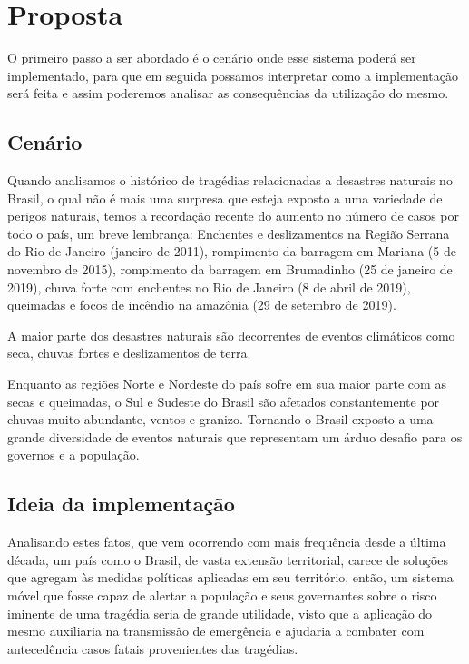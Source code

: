 \documentclass[conference]{IEEEtran}
\begin{document}
\section{Proposta}

O primeiro passo a ser abordado é o cenário onde esse sistema poderá ser implementado, para que em seguida possamos interpretar como a implementação será feita e  assim poderemos analisar as consequências da utilização do mesmo.

\subsection{Cenário}\label{AA}
Quando analisamos o histórico de tragédias relacionadas a desastres naturais no Brasil, o qual não é mais uma surpresa que esteja exposto a uma variedade de perigos naturais, temos a recordação recente do aumento no número de casos por todo o país, um breve lembrança: Enchentes e deslizamentos na Região Serrana do Rio de Janeiro (janeiro de 2011), rompimento da barragem em Mariana (5 de novembro de 2015), rompimento da barragem em Brumadinho (25 de janeiro de 2019), chuva forte com enchentes no Rio de Janeiro  (8 de abril de 2019), queimadas e focos de incêndio na amazônia (29 de setembro de 2019).

A maior parte dos desastres naturais são decorrentes de eventos climáticos como seca, chuvas fortes e deslizamentos de terra. 

Enquanto as regiões Norte e Nordeste do país sofre em sua maior parte com as secas e queimadas, o Sul  e Sudeste do Brasil são afetados constantemente por chuvas muito abundante, ventos e granizo. Tornando o Brasil exposto a uma grande diversidade de eventos naturais que representam um árduo desafio para os governos e a população.

\subsection{Ideia da implementação}

Analisando estes fatos, que vem ocorrendo com mais frequência desde a última década, um país como o Brasil, de vasta extensão territorial, carece de soluções que agregam às medidas políticas aplicadas em seu território, então, um sistema móvel que fosse capaz de alertar a população e seus governantes sobre o risco iminente de uma tragédia seria de grande utilidade, visto que a aplicação do mesmo auxiliaria na transmissão de emergência e ajudaria a combater com antecedência casos fatais provenientes das tragédias.
\end{document}
